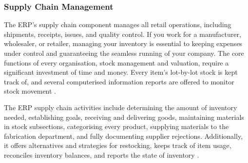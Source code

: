 \subsubsection{Supply Chain Management}
\par{The ERP's supply chain component manages all retail operations, including shipments, receipts, issues, and quality control. If you work for a manufacturer, wholesaler, or retailer, managing your inventory is essential to keeping expenses under control and guaranteeing the seamless running of your company. The core functions of every organisation, stock management and valuation, require a significant investment of time and money. Every item's lot-by-lot stock is kept track of, and several computerised information reports are offered to monitor stock movement \citep{ahlawat2017role}.

The ERP supply chain activities include determining the amount of inventory needed, establishing goals, receiving and delivering goods, maintaining materials in stock subsections, categorising every product, supplying materials to the fabrication department, and fully documenting supplier rejections. Additionally, it offers alternatives and strategies for restocking, keeps track of item usage, reconciles inventory balances, and reports the state of inventory \citep{ahlawat2017role}.}
